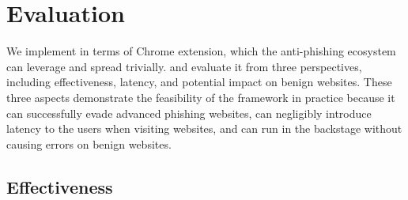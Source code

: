 


\section{Evaluation}
\label{s:eval}

We implement \spartacus in terms of Chrome extension, which the anti-phishing ecosystem can leverage and spread trivially.
and evaluate it from three perspectives, including effectiveness, latency, and potential impact on benign websites.
These three aspects demonstrate the feasibility of the \spartacus framework in practice because it can successfully evade advanced phishing websites, can negligibly introduce latency to the users when visiting websites, and can run in the backstage without causing errors on benign websites.









\subsection{Effectiveness}


